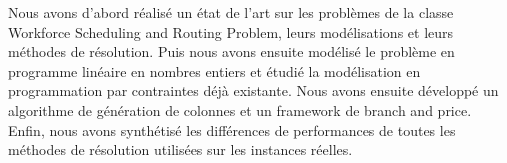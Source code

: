 Nous avons d'abord réalisé un état de l'art sur les problèmes de la classe Workforce Scheduling and Routing Problem, leurs modélisations et leurs méthodes de résolution. 
Puis nous avons ensuite modélisé le problème en programme linéaire en nombres entiers et étudié la modélisation en programmation par contraintes déjà existante.
Nous avons ensuite développé un algorithme de génération de colonnes et un framework de branch and price.
Enfin, nous avons synthétisé les différences de performances de toutes les méthodes de résolution utilisées sur les instances réelles. 


